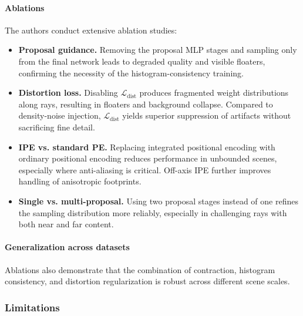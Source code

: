 \begin{enrichment}
\begin{enrichment}
        \paragraph{Ablations}
        The authors conduct extensive ablation studies:
        \begin{itemize}
            \item \textbf{Proposal guidance.} Removing the proposal MLP stages and sampling only from the final network leads to degraded quality and visible floaters, confirming the necessity of the histogram-consistency training.
            \item \textbf{Distortion loss.} Disabling $\mathcal{L}_{\mathrm{dist}}$ produces fragmented weight distributions along rays, resulting in floaters and background collapse. Compared to density-noise injection, $\mathcal{L}_{\mathrm{dist}}$ yields superior suppression of artifacts without sacrificing fine detail.
            \item \textbf{IPE vs. standard PE.} Replacing integrated positional encoding with ordinary positional encoding reduces performance in unbounded scenes, especially where anti-aliasing is critical. Off-axis IPE further improves handling of anisotropic footprints.
            \item \textbf{Single vs. multi-proposal.} Using two proposal stages instead of one refines the sampling distribution more reliably, especially in challenging rays with both near and far content.
        \end{itemize}
        
        \paragraph{Generalization across datasets}
        Ablations also demonstrate that the combination of contraction, histogram consistency, and distortion regularization is robust across different scene scales.
        
        \subsubsection{Limitations}
        \label{subsubsec:chapter23_mipnerf360_limitations}
        

\end{enrichment}
\end{enrichment}
